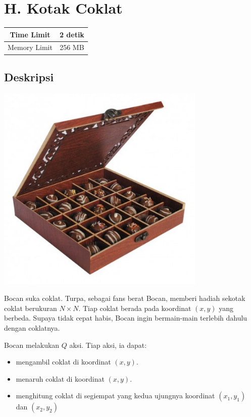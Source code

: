 \documentclass{article}
\begin{document}
\section*{\hfil H. Kotak Coklat\hfil}

\begin{center}
\begin{tabular}{ |cc| } 
 \hline
 Time Limit & 2 detik \\
 \hline 
 Memory Limit & 256 MB \\
 \hline
\end{tabular}
\end{center}

\subsection*{Deskripsi}

\includegraphics[width=10cm]{box-of-chocolate}

\par\noindent Bocan suka coklat. Turpa, sebagai fans berat Bocan, memberi hadiah sekotak coklat berukuran $N \times N$. Tiap coklat berada pada koordinat $(x,y)$ yang berbeda. Supaya tidak cepat habis, Bocan ingin bermain-main terlebih dahulu dengan coklatnya.

\par\noindent Bocan melakukan $Q$ aksi. Tiap aksi, ia dapat:

\begin{itemize}
	\item mengambil coklat di koordinat $(x,y)$.
	\item menaruh coklat di koordinat $(x,y)$.
	\item menghitung coklat di segiempat yang kedua ujungnya koordinat $(x_1,y_1)$ dan $(x_2,y_2)$
\end{itemize}
\end{document}
